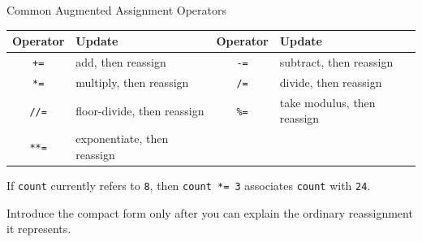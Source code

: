 \documentclass[aspectratio=169,10pt]{beamer}
\begin{document}
\begin{frame}{Common Augmented Assignment Operators}

  \begin{center}
  \renewcommand{\arraystretch}{1.25}
  \begin{tabular}{c|l@{\qquad}c|l}
    \textbf{Operator} & \textbf{Update} & \textbf{Operator} & \textbf{Update} \\\hline
    \texttt{+=} & add, then reassign & \texttt{-=} & subtract, then reassign \\
    \texttt{*=} & multiply, then reassign & \texttt{/=} & divide, then reassign \\
    \texttt{//=} & floor-divide, then reassign & \texttt{\%=} & take modulus, then reassign \\
    \texttt{**=} & exponentiate, then reassign & &
  \end{tabular}
  \end{center}

  \vspace{0.14in}

  \begin{exampleblockcp}

    If \texttt{count} currently refers to \texttt{8}, then \texttt{count *= 3} associates \texttt{count} with \texttt{24}.

  \end{exampleblockcp}

  \begin{keyidea}

    Introduce the compact form only after you can explain the ordinary reassignment it represents.

  \end{keyidea}

\end{frame}

\end{document}
